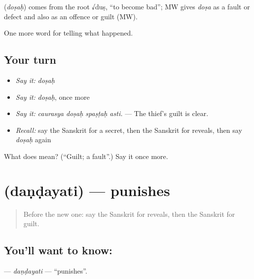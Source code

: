 \begin{cousinweb}
\textbf{} (\emph{doṣaḥ}) comes from the root √duṣ, \textquotedblleft{}to become bad\textquotedblright{}; MW gives \emph{doṣa} as a fault or defect and also as an offence or guilt (MW).
\end{cousinweb}

\begin{grammarlens}[title={What you've built}]
One more word for telling what happened.
\end{grammarlens}

\subsection*{Your turn}
\begin{itemize}
\raggedright
  \item \emph{Say it:} \emph{doṣaḥ}
  \item \emph{Say it:} \emph{doṣaḥ}, once more
  \item \emph{Say it:} \emph{caurasya doṣaḥ spaṣṭaḥ asti.} — The thief's guilt is clear.
  \item \emph{Recall:} say the Sanskrit for a secret, then the Sanskrit for reveals, then say \emph{doṣaḥ} again
\end{itemize}

\begin{tcolorbox}[breakable,colback=teal!4,colframe=teal!35!black,title={Before you move on}]
What does  mean? (\textquotedblleft{}Guilt; a fault\textquotedblright{}.) Say it once more.
\end{tcolorbox}
\section[\texorpdfstring{\sk{दण्डयति} (daṇḍayati)}{दण्डयति (daṇḍayati)}]{ (daṇḍayati) — punishes}

\label{lesson:SA-C293-dandayati}



\begin{quote}
Before the new one: say the Sanskrit for reveals, then the Sanskrit for guilt.
\end{quote}

\subsection*{You'll want to know: }
\textbf{} — \emph{daṇḍayati} — \textquotedblleft{}punishes\textquotedblright{}.

